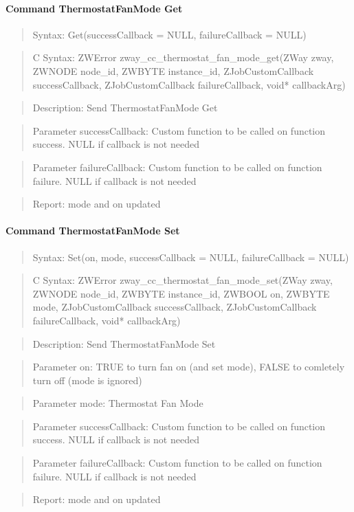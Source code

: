 \paragraph{Command ThermostatFanMode Get}
\begin{quote}Syntax: Get(successCallback = NULL, failureCallback = NULL)\end{quote}
\begin{quote}C Syntax: ZWError zway\_cc\_thermostat\_fan\_mode\_get(ZWay zway, ZWNODE node\_id, ZWBYTE instance\_id, ZJobCustomCallback successCallback, ZJobCustomCallback failureCallback, void* callbackArg)\end{quote}
\begin{quote}Description: Send ThermostatFanMode Get\end{quote}
\begin{quote}Parameter successCallback: Custom function to be called on function success. NULL if callback is not needed\end{quote}
\begin{quote}Parameter failureCallback: Custom function to be called on function failure. NULL if callback is not needed\end{quote}
\begin{quote}Report: mode and on updated\end{quote}

\paragraph{Command ThermostatFanMode Set}
\begin{quote}Syntax: Set(on, mode, successCallback = NULL, failureCallback = NULL)\end{quote}
\begin{quote}C Syntax: ZWError zway\_cc\_thermostat\_fan\_mode\_set(ZWay zway, ZWNODE node\_id, ZWBYTE instance\_id, ZWBOOL on, ZWBYTE mode, ZJobCustomCallback successCallback, ZJobCustomCallback failureCallback, void* callbackArg)\end{quote}
\begin{quote}Description: Send ThermostatFanMode Set\end{quote}
\begin{quote}Parameter on: TRUE to turn fan on (and set mode), FALSE to comletely turn off (mode is ignored)\end{quote}
\begin{quote}Parameter mode: Thermostat Fan Mode\end{quote}
\begin{quote}Parameter successCallback: Custom function to be called on function success. NULL if callback is not needed\end{quote}
\begin{quote}Parameter failureCallback: Custom function to be called on function failure. NULL if callback is not needed\end{quote}
\begin{quote}Report: mode and on updated\end{quote}


